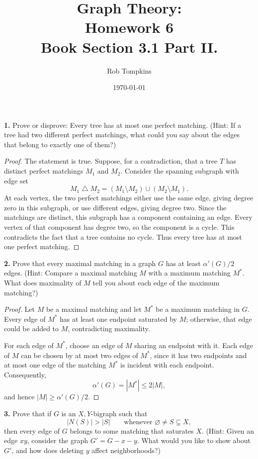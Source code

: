 \documentclass[12pt]{amsart}
\title{Graph Theory:\\Homework 6\\ Book Section 3.1 Part II.}
\author{Rob Tompkins}
\date{\today}
\theoremstyle{conjecture}
\theoremstyle{definition}
\theoremstyle{question}
\theoremstyle{theorem}
\begin{document}
    \maketitle
    \noindent\textbf{1.} Prove or disprove: Every tree has at most one perfect matching.
    (Hint: If a tree had two different perfect matchings, what could you say about the
    edges that belong to exactly one of them?)

    \begin{proof}
    The statement is true. Suppose, for a contradiction, that a tree \(T\)
    has distinct perfect matchings \(M_1\) and \(M_2\). Consider the spanning
    subgraph with edge set
    \[
        M_1\mathbin{\triangle}M_2
        =(M_1\setminus M_2)\cup(M_2\setminus M_1).
    \]
    At each vertex, the two perfect matchings either use the same edge,
    giving degree zero in this subgraph, or use different edges, giving
    degree two. Since the matchings are distinct, this subgraph has a
    component containing an edge. Every vertex of that component has
    degree two, so the component is a cycle. This contradicts the fact
    that a tree contains no cycle. Thus every tree has at most one
    perfect matching.
    \end{proof}

    \noindent\textbf{2.} Prove that every maximal matching in a graph \(G\) has at least
    \(\alpha'(G)/2\) edges.
    (Hint: Compare a maximal matching $M$ with a maximum matching $M^*$.
    What does maximality of $M$ tell you about each edge of the maximum matching?)

    \begin{proof}
    Let \(M\) be a maximal matching and let \(M^*\) be a maximum
    matching in \(G\). Every edge of \(M^*\) has at least one endpoint
    saturated by \(M\); otherwise, that edge could be added to \(M\),
    contradicting maximality.

    For each edge of \(M^*\), choose an edge of \(M\) sharing an endpoint
    with it. Each edge of \(M\) can be chosen by at most two edges of
    \(M^*\), since it has two endpoints and at most one edge of the
    matching \(M^*\) is incident with each endpoint. Consequently,
    \[
        \alpha'(G)=|M^*|\leq 2|M|,
    \]
    and hence \(|M|\geq \alpha'(G)/2\).
    \end{proof}

    \noindent\textbf{3.} Prove that if \(G\) is an \(X,Y\)-bigraph such that
    \[
        |N(S)| > |S|
        \qquad \text{whenever } \varnothing \neq S \subsetneq X,
    \]
    then every edge of \(G\) belongs to some matching that saturates \(X\).
    (Hint: Given an edge \(xy\), consider the graph
    \(G' = G-x-y\). What would you like to show about \(G'\), and how
    does deleting \(y\) affect neighborhoods?)
\end{document}
